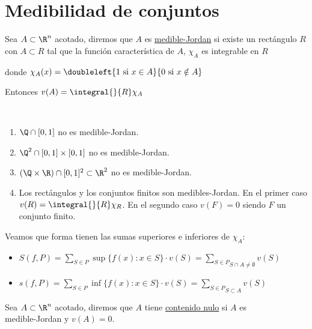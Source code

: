 \section{Medibilidad de conjuntos}

	\begin{defi} Sea $A\subset\R^n$ acotado, diremos que $A$ es \underline{medible-Jordan} si existe un rectángulo $R$ con $A\subset R$ tal que la función característica de $A$, $\chi_A$ es integrable en $R$
	\begin{center}donde $\chi_A(x)=\doubleleft{1\mathrm{\ si\ }x\in A}{0\mathrm{\ si\ }x\notin A}$\end{center}
	Entonces $v(A)=\integral{}{R}\chi_A$
	\end{defi}
	
	\begin{ejem}\ 
	\begin{enumerate}[1)]
	\item $\Q \cap [0,1]$ no es medible-Jordan.
	\item $\Q^2\cap[0,1]\times[0,1]$ no es medible-Jordan.
	\item $(\Q\times\R)\cap[0,1]^2\subset\R^2$ no es medible-Jordan.
	\item Los rectángulos y los conjuntos finitos son medibles-Jordan. En el primer caso\\ $v(R)=\integral{}{R}\chi_R$. En el segundo caso $v(F)=0$ siendo $F$ un conjunto finito.
	\end{enumerate}
	\end{ejem}
	
	\begin{observacion} Veamos que forma tienen las sumas superiores e inferiores de $\chi_A$:
	\begin{itemize}
	\item $S(f,P)=\underset{S\in P}\sum \sup\{f(x):x\in S\}\cdot v(S)=\underset{S\cap A\neq\emptyset}{\underset{S\in P}\sum}v(S)$
	\item $s(f,P)=\underset{S\in P}\sum \inf\{f(x):x\in S\}\cdot v(S)=\underset{S\subset A}{\underset{S\in P}\sum}v(S)$
	\end{itemize}
	\end{observacion}
	
	\begin{defi} Sea $A\subset\R^n$ acotado, diremos que $A$ tiene \underline{contenido nulo} si $A$ es\\ medible-Jordan y $v(A)=0$.
	\end{defi}
	

